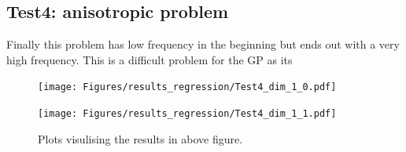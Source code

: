    
    
    



\subsection{Test4: anisotropic problem}
Finally this problem has low frequency in the beginning but ends out with a very high frequency. This is a difficult
problem for the GP as its 

\begin{figure}[H]
  \centering
  \begin{minipage}[b]{0.49\textwidth}
   \texttt{[image: Figures/results\_regression/Test4\_dim\_1\_0.pdf]}
  \end{minipage}
  \hfill
  \begin{minipage}[b]{0.49\textwidth}
    \texttt{[image: Figures/results\_regression/Test4\_dim\_1\_1.pdf]}
   \end{minipage}
  \caption{Plots visulising the results in above figure.}
\end{figure}


